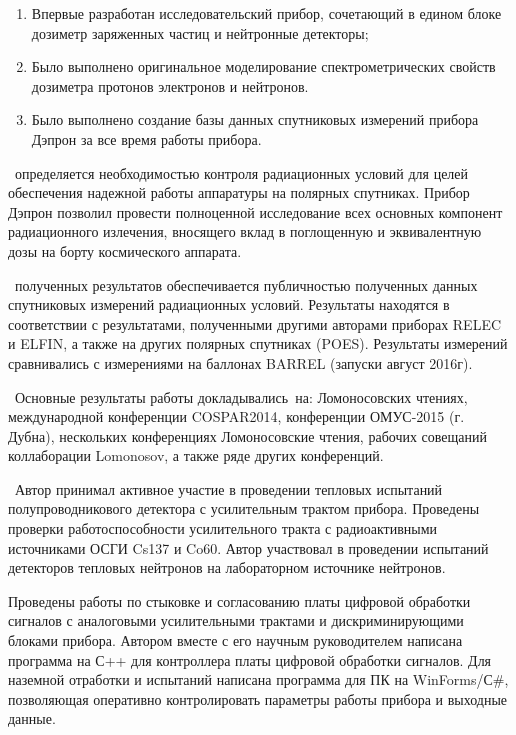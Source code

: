 \novelty
\begin{enumerate}
  \item Впервые разработан исследовательский прибор, сочетающий в едином блоке дозиметр заряженных частиц и нейтронные детекторы;
  \item Было выполнено оригинальное моделирование спектрометрических свойств дозиметра протонов электронов и нейтронов.
  \item Было выполнено создание базы данных спутниковых измерений прибора Дэпрон за все время работы прибора.
\end{enumerate}

\influence\ определяется необходимостью контроля радиационных условий для целей обеспечения надежной работы аппаратуры на полярных спутниках. Прибор Дэпрон позволил провести полноценной исследование всех основных компонент радиационного излечения, вносящего вклад в поглощенную и эквивалентную дозы на борту космического аппарата.

\reliability\ полученных результатов обеспечивается публичностью полученных данных спутниковых измерений радиационных условий. Результаты находятся в соответствии с результатами, полученными другими авторами приборах RELEC и ELFIN, а также на других полярных спутниках (POES). Результаты измерений сравнивались с измерениями на баллонах BARREL (запуски август 2016г).

\probation\
Основные результаты работы докладывались~на:
Ломоносовских чтениях, международной конференции COSPAR2014, конференции ОМУС-2015 (г. Дубна), нескольких конференциях Ломоносовские чтения, рабочих совещаний коллаборации Lomonosov, а также ряде других конференций.

\contribution\ Автор принимал активное участие в проведении тепловых испытаний полупроводникового детектора с усилительным трактом прибора. Проведены проверки работоспособности усилительного тракта с радиоактивными источниками ОСГИ Cs137 и Co60. Автор участвовал в проведении испытаний детекторов тепловых нейтронов на лабораторном источнике нейтронов. 

Проведены работы по стыковке и согласованию платы цифровой обработки сигналов с аналоговыми усилительными трактами и дискриминирующими блоками прибора. Автором вместе с его научным руководителем написана программа на С++ для контроллера платы цифровой обработки сигналов. Для наземной отработки и испытаний написана программа для ПК на WinForms/С\#, позволяющая оперативно контролировать параметры работы прибора и выходные данные. 

